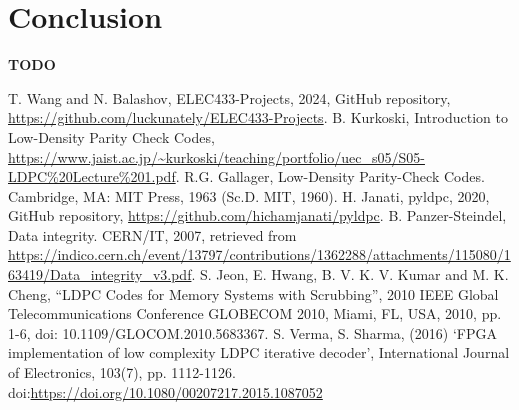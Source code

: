 \documentclass[conference]{IEEEtran}
\begin{document}


\section{Conclusion}
\textbf{TODO}

\begin{thebibliography}{00}
   T. Wang and N. Balashov, ELEC433-Projects, 2024, GitHub repository, \url{https://github.com/luckunately/ELEC433-Projects}.
   B. Kurkoski, Introduction to Low-Density Parity Check Codes, \url{https://www.jaist.ac.jp/~kurkoski/teaching/portfolio/uec_s05/S05-LDPC%20Lecture%201.pdf}.
   R.G. Gallager, Low-Density Parity-Check Codes. Cambridge, MA: MIT Press, 1963 (Sc.D. MIT, 1960).
   H. Janati, pyldpc, 2020, GitHub repository, \url{https://github.com/hichamjanati/pyldpc}.
   B. Panzer-Steindel, Data integrity. CERN/IT, 2007, retrieved from \url{https://indico.cern.ch/event/13797/contributions/1362288/attachments/115080/163419/Data_integrity_v3.pdf}.
  S. Jeon, E. Hwang, B. V. K. V. Kumar and M. K. Cheng, ``LDPC Codes for Memory Systems with Scrubbing'', 2010 IEEE Global Telecommunications Conference GLOBECOM 2010, Miami, FL, USA, 2010, pp. 1-6, doi: 10.1109/GLOCOM.2010.5683367.
   S. Verma, S. Sharma, (2016) `FPGA implementation of low complexity LDPC iterative decoder', International Journal of Electronics, 103(7), pp. 1112-1126. doi:\url{https://doi.org/10.1080/00207217.2015.1087052}
\end{thebibliography}
\end{document}
